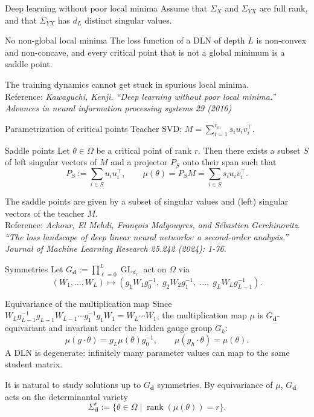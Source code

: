 \documentclass[aspectratio=169,11pt]{beamer}
\begin{document}
\begin{frame}{Deep learning without poor local minima}
Assume that $\Sigma_X$ and $\Sigma_{YX}$ are full rank, and that $\Sigma_{YX}$ has $d_L$ distinct singular values.
\begin{block}{No non-global local minima}
    The loss function of a DLN of depth $L$ is non-convex and non-concave, and every critical point that is not a global minimum is a saddle point.
\end{block}
The training dynamics cannot get stuck in spurious local minima.
\\
Reference: \textit{Kawaguchi, Kenji. ``Deep learning without poor local minima.'' Advances in neural information processing systems 29 (2016)}
\end{frame}
\begin{frame}{Parametrization of critical points}
Teacher SVD: \(M=\sum_{i=1}^{r_m}s_i u_i v_i^{\top}\).
\begin{block}{Saddle points}
    Let $\theta\in\Omega$ be a critical point of rank $r$. Then there exists a subset $S$ of left singular vectors of $M$ and a projector $P_S$ onto their span such that
    \[
    P_S := \sum_{i\in S}u_i u_i^{\top},
    \qquad
    \mu(\theta)=P_S M=\sum_{i\in S}s_i u_i v_i^{\top}.
    \]
\end{block}
The saddle points are given by a subset of singular values and (left) singular vectors of the teacher $M$.
\\
Reference: \textit{Achour, El Mehdi, François Malgouyres, and Sébastien Gerchinovitz. ``The loss landscape of deep linear neural networks: a second-order analysis.'' Journal of Machine Learning Research 25.242 (2024): 1-76.}
\end{frame}
\begin{frame}{Symmetries}
\small
Let $G_{\mathbf{d}}:=\prod_{\ell=0}^{L} \operatorname{GL}_{d_\ell}$ act on $\Omega$ via
\[
(W_1,\ldots,W_L)
\mapsto
(g_1W_1g_0^{-1},\; g_2W_2g_1^{-1},\;\ldots,\; g_L W_L g_{L-1}^{-1}).
\]
\begin{block}{Equivariance of the multiplication map}
    Since \(W_Lg_{L-1}^{-1}g_{L-1}W_{L-1}\cdots g_1^{-1}g_1W_1=W_L\cdots W_1\), the multiplication map $\mu$ is $G_{\mathbf{d}}$-equivariant and invariant under the hidden gauge group $G_h$:
    \[
    \mu(g\cdot \theta)=g_L\mu(\theta)g_0^{-1},
    \qquad
    \mu(g_h\cdot \theta) = \mu(\theta).
    \]
A DLN is degenerate: infinitely many parameter values can map to the same student matrix.
\end{block}
It is natural to study solutions up to $G_{\mathbf{d}}$ symmetries. By equivariance of $\mu$, $G_{\mathbf{d}}$ acts on the determinantal variety
\[
\Sigma_{\mathbf{d}}^{r}:=\{\theta\in \Omega\mid\operatorname{rank}(\mu(\theta)) = r\}.
\]
\end{frame}
\end{document}
